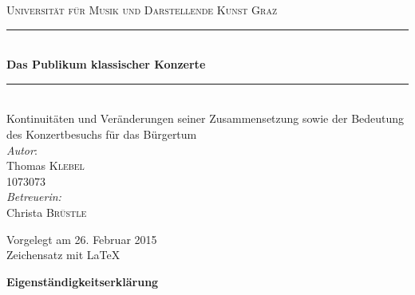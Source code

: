 \documentclass[a4paper, german, oneside]{scrbook}
\date{\displaydate{date}}
\begin{document}
	\begin{titlepage}
	
		\begin{center}



		\textsc{\LARGE Universität für Musik und Darstellende Kunst Graz}\\[1.5cm]



		\newcommand{\HRule}{\rule{\linewidth}{0.5mm}}
		\HRule \\[0.4cm]
		{ \huge \bfseries Das Publikum klassischer Konzerte}\\[0.4cm]

		\HRule \\[0.5cm] %


		\Large Kontinuitäten und Veränderungen seiner Zusammensetzung sowie der Bedeutung des Konzertbesuchs für das Bürgertum\\[2cm]

		\Large \emph{Autor}:\\
		Thomas \textsc{Klebel}\\[0.1cm]
		\large 1073073\\[1cm]

		\Large \emph{Betreuerin:}\\
		Christa \textsc{Brüstle}\\[1cm]



		\vfill

		\Large{Vorgelegt am 26. Februar 2015}\\[1cm]
		\normalsize{Zeichensatz mit \LaTeX}
		

		\end{center}

	\end{titlepage}

	



\newpage
\thispagestyle{empty}
\begin{center}
\Large\bfseries Eigenständigkeitserklärung
\end{center}
\end{document}
